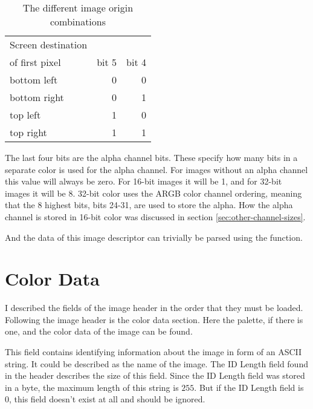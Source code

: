
\begin{table}
  \centering
  \begin{tabular}{lrr}
    \toprule
    Screen destination \\ of first pixel & bit 5 & bit 4 \\
    \midrule
    bottom left & 0 & 0 \\
    bottom right & 0 & 1 \\
    top left & 1 & 0 \\
    top right & 1 & 1 \\
    \bottomrule
  \end{tabular}
  \caption{The different image origin combinations}
  \label{tab:image-origin}
\end{table}

The last four bits are the alpha channel bits. These specify how many
bits in a separate color is used for the alpha channel. For images
without an alpha channel this value will always be zero. For 16-bit
images it will be 1, and for 32-bit images it will be 8. 32-bit color
uses the ARGB color channel ordering, meaning that the 8 highest bits,
bits 24-31, are used to store the alpha. How the alpha channel is
stored in 16-bit color was discussed in section
\ref{sec:other-channel-sizes}.

And the data of this image descriptor can trivially be parsed using
the  function.

\section{Color Data}
\label{sec:color-data}

I described the fields of the image header in the order that they must
be loaded. Following the image header is the color data section. Here
the palette, if there is one, and the color data of the image can be
found.


This field contains identifying information about the image in form of
an ASCII string. It could be described as the name of the image. The
ID Length field found in the header describes the size of this
field. Since the ID Length field was stored in a byte, the maximum
length of this string is $255$. But if the ID Length field is 0, this field
doesn't exist at all and should be ignored.

